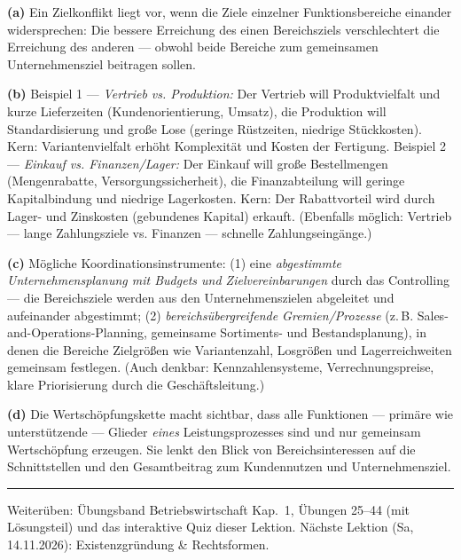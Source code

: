 \documentclass[11pt, a4paper]{article}
\begin{document}
\begin{loesung}[title={Lösung Aufgabe~9 --- Zielkonflikte zwischen Funktionsbereichen}]
\textbf{(a)} Ein Zielkonflikt liegt vor, wenn die Ziele einzelner Funktionsbereiche
einander widersprechen: Die bessere Erreichung des einen Bereichsziels verschlechtert
die Erreichung des anderen --- obwohl beide Bereiche zum gemeinsamen Unternehmensziel
beitragen sollen.

\textbf{(b)} Beispiel 1 --- \emph{Vertrieb vs. Produktion:} Der Vertrieb will
Produktvielfalt und kurze Lieferzeiten (Kundenorientierung, Umsatz), die Produktion will
Standardisierung und große Lose (geringe Rüstzeiten, niedrige Stückkosten). Kern:
Variantenvielfalt erhöht Komplexität und Kosten der Fertigung.
Beispiel 2 --- \emph{Einkauf vs. Finanzen/Lager:} Der Einkauf will große Bestellmengen
(Mengenrabatte, Versorgungssicherheit), die Finanzabteilung will geringe Kapitalbindung
und niedrige Lagerkosten. Kern: Der Rabattvorteil wird durch Lager- und Zinskosten
(gebundenes Kapital) erkauft. (Ebenfalls möglich: Vertrieb --- lange Zahlungsziele vs.
Finanzen --- schnelle Zahlungseingänge.)

\textbf{(c)} Mögliche Koordinationsinstrumente: (1) eine \emph{abgestimmte
Unternehmensplanung mit Budgets und Zielvereinbarungen} durch das Controlling --- die
Bereichsziele werden aus den Unternehmenszielen abgeleitet und aufeinander abgestimmt;
(2) \emph{bereichsübergreifende Gremien/Prozesse} (z.\,B. Sales-and-Operations-Planning,
gemeinsame Sortiments- und Bestandsplanung), in denen die Bereiche Zielgrößen wie
Variantenzahl, Losgrößen und Lagerreichweiten gemeinsam festlegen. (Auch denkbar:
Kennzahlensysteme, Verrechnungspreise, klare Priorisierung durch die Geschäftsleitung.)

\textbf{(d)} Die Wertschöpfungskette macht sichtbar, dass alle Funktionen --- primäre wie
unterstützende --- Glieder \emph{eines} Leistungsprozesses sind und nur gemeinsam
Wertschöpfung erzeugen. Sie lenkt den Blick von Bereichsinteressen auf die Schnittstellen
und den Gesamtbeitrag zum Kundennutzen und Unternehmensziel.
\end{loesung}

\vspace{1em}
\hrule
\vspace{0.8em}
\noindent\textsf{\small Weiterüben: Übungsband Betriebswirtschaft Kap.~1, Übungen 25--44
(mit Lösungsteil) und das interaktive Quiz dieser Lektion. Nächste Lektion (Sa, 14.11.2026):
Existenzgründung \& Rechtsformen.}
\end{document}
